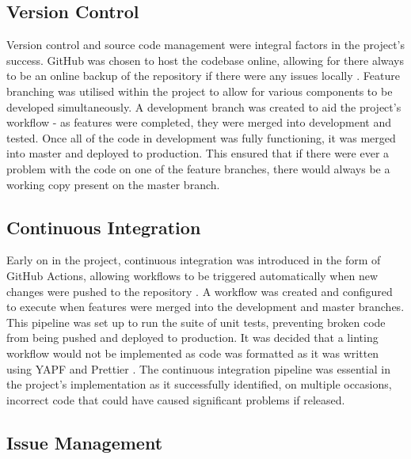 \documentclass{l4proj}
\begin{document}
\subsection{Version Control}

Version control and source code management were integral factors in the project's success. GitHub was chosen to host the codebase online, allowing for there always to be an online backup of the repository if there were any issues locally \citep{github}. Feature branching was utilised within the project to allow for various components to be developed simultaneously. A development branch was created to aid the project's workflow - as features were completed, they were merged into development and tested. Once all of the code in development was fully functioning, it was merged into master and deployed to production. This ensured that if there were ever a problem with the code on one of the feature branches, there would always be a working copy present on the master branch.

\subsection{Continuous Integration}
\label{section:continuous_integration}

Early on in the project, continuous integration was introduced in the form of GitHub Actions, allowing workflows to be triggered automatically when new changes were pushed to the repository \citep{githubactions}. A workflow was created and configured to execute when features were merged into the development and master branches. This pipeline was set up to run the suite of unit tests, preventing broken code from being pushed and deployed to production. It was decided that a linting workflow would not be implemented as code was formatted as it was written using YAPF \citep{yapf} and Prettier \citep{prettier}. The continuous integration pipeline was essential in the project's implementation as it successfully identified, on multiple occasions, incorrect code that could have caused significant problems if released.

\subsection{Issue Management}
\label{section:issue_management}
\end{document}
